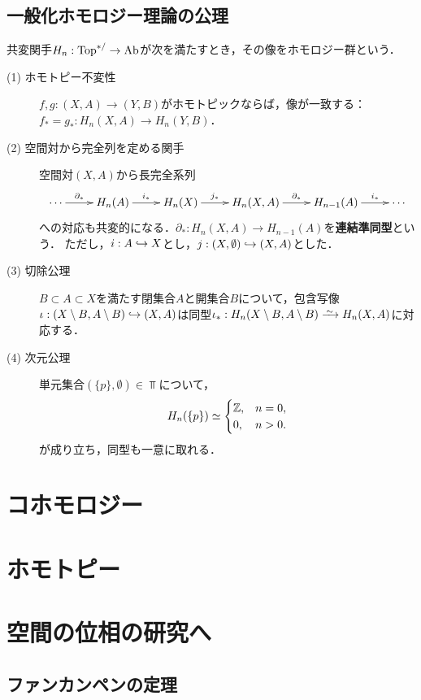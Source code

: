 \documentclass[uplatex,dvipdfmx]{jsreport}
\begin{document}
\section{一般化ホモロジー理論の公理}

\begin{axiom}
    共変関手$H_n:\mathrm{Top}^{*/}\to\mathrm{Ab}$が次を満たすとき，その像をホモロジー群という．
    \begin{description}
        \item[(1) ホモトピー不変性] $f,g:(X,A)\to (Y,B)$がホモトピックならば，像が一致する：$f_*=g_*:H_n(X,A)\to H_n(Y,B)$．
        \item[(2) 空間対から完全列を定める関手] 空間対$(X,A)$から長完全系列
        \[\xymatrix@R-1pc{
            \cdots\ar[r]^-{\partial_*}&H_n(A)\ar[r]^-{i_*}&H_n(X)\ar[r]^-{j_*}&H_n(X,A)\ar[r]^-{\partial_*}&H_{n-1}(A)\ar[r]^-{i_*}&\cdots
        }\]
        への対応も共変的になる．$\partial_*:H_n(X,A)\to H_{n-1}(A)$を\textbf{連結準同型}という．
        ただし，$i:A\hookrightarrow X$とし，$j:(X,\emptyset)\hookrightarrow(X,A)$とした．
        \item[(3) 切除公理] $B\subset A\subset X$を満たす閉集合$A$と開集合$B$について，包含写像$\iota:(X\setminus B,A\setminus B)\hookrightarrow (X,A)$は同型$\iota_*:H_n(X\setminus B,A\setminus B)\iso H_n(X,A)$に対応する．
        \item[(4) 次元公理] 単元集合$(\{p\},\emptyset)\in\Top$について，
        \[H_n(\{p\})\simeq
        \begin{cases}
            \mathbb{Z},&n=0,\\
            0,&n>0.
        \end{cases}\]
        が成り立ち，同型も一意に取れる．
    \end{description}
\end{axiom}



\chapter{コホモロジー}

\chapter{ホモトピー}

\chapter{空間の位相の研究へ}

\section{ファンカンペンの定理}
\end{document}
